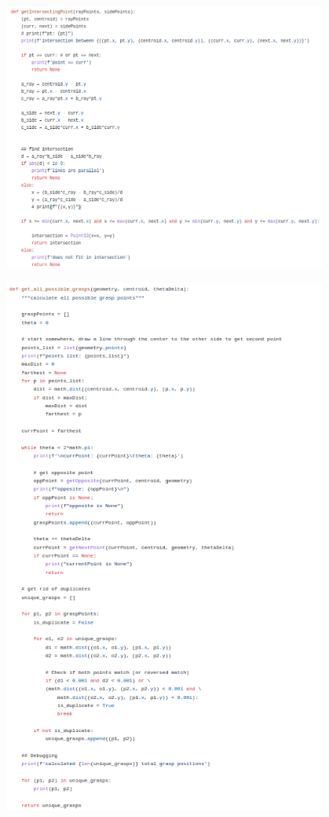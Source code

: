 \documentclass[12pt]{article}
\begin{document}
\begin{center}
	\includegraphics[width=0.8\textwidth]{getintersect.png}
\end{center}

\begin{center}
	\includegraphics[width=0.8\textwidth]{allpossiblegrasps.png}
\end{center}
\end{document}

